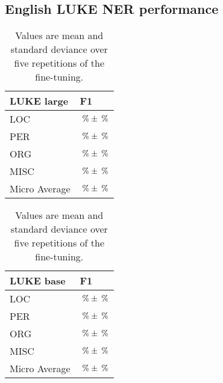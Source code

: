 \documentclass[main.tex]{subfiles}
\begin{document}
\subsection{English LUKE NER performance}
\begin{table}[H]
    \begin{tabular}{ll}
        LUKE  large& F1\\\hline
        LOC             & $\:\text{\%{}} \pm \:\text{\%{}}$       \\
        PER             & $\:\text{\%{}} \pm \:\text{\%{}}$      \\
        ORG             & $\:\text{\%{}} \pm \:\text{\%{}}$       \\
        MISC            & $\:\text{\%{}} \pm \:\text{\%{}}$           \\\hline
        Micro Average   & $\:\text{\%{}} \pm \:\text{\%{}}$
    \end{tabular}
    \quad
    \begin{tabular}{ll}
        LUKE base & F1\\\hline
        LOC             & $\:\text{\%{}} \pm \:\text{\%{}}$       \\
        PER             & $\:\text{\%{}} \pm \:\text{\%{}}$      \\
        ORG             & $\:\text{\%{}} \pm \:\text{\%{}}$       \\
        MISC            & $\:\text{\%{}} \pm \:\text{\%{}}$           \\\hline
        Micro Average   & $\:\text{\%{}} \pm \:\text{\%{}}$
    \end{tabular}
    \caption{
        Values are mean and standard deviance over five repetitions of the fine-tuning.
    }
\end{table}
\end{document}
